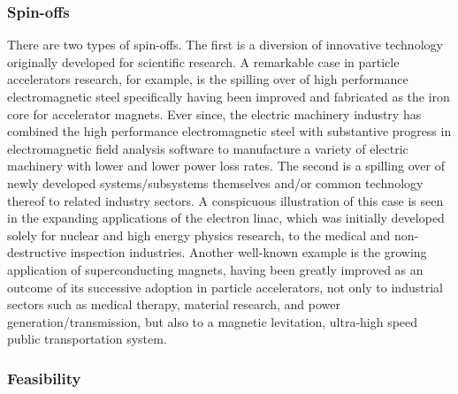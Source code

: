\subsubsection{Spin-offs}

There are two types of spin-offs. The first is a diversion of innovative
technology originally developed for scientific research. A remarkable case in particle
accelerators research, for example, is the spilling over of high performance
electromagnetic steel specifically having been improved and fabricated as the iron core for accelerator magnets. Ever since, the electric machinery industry has combined the high performance electromagnetic steel with substantive progress in electromagnetic field analysis software to manufacture a variety of electric machinery with lower and lower power loss rates. The second is a spilling over of newly developed systems/subsystems themselves and/or common technology thereof to related industry sectors. A conspicuous illustration of this case is seen in the expanding applications of the electron linac, which was initially developed solely for nuclear and high energy physics research, to the medical and non-destructive inspection industries. Another well-known example is the growing application of superconducting magnets, having been greatly improved as an outcome of its successive adoption in particle accelerators, not only to industrial sectors such as medical therapy, material research, and power generation/transmission, but also to a magnetic levitation, ultra-high speed public transportation system. \cite{ILC:SpinOffReport}
 
\subsubsection{Feasibility}


